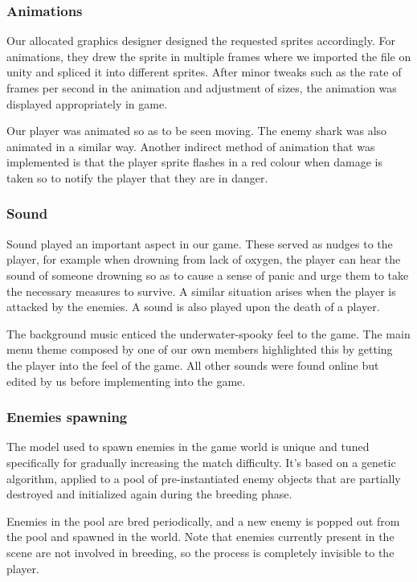 \documentclass[11pt]{article}
\begin{document}
\subsubsection{Animations}
Our allocated graphics designer designed the requested sprites accordingly. For animations, they drew the sprite in multiple frames where we imported the file on unity and spliced it into different sprites. After minor tweaks such as the rate of frames per second in the animation and adjustment of sizes, the animation was displayed appropriately in game.

Our player was animated so as to be seen moving. The enemy shark was also animated in a similar way. Another indirect method of animation that was implemented is that the player sprite flashes in a red colour when damage is taken so to notify the player that they are in danger.

\subsubsection{Sound}
Sound played an important aspect in our game. These served as nudges to the player, for example when drowning from lack of oxygen, the player can hear the sound of someone drowning so as to cause a sense of panic and urge them to take the necessary measures to survive. A similar situation arises when the player is attacked by the enemies. A sound is also played upon the death of a player.

The background music enticed the underwater-spooky feel to the game. The main menu theme composed by one of our own members highlighted this by getting the player into the feel of the game. All other sounds were found online but edited by us before implementing into the game.


\subsubsection{Enemies spawning}
The model used to spawn enemies in the game world is unique and tuned specifically for gradually increasing the match difficulty. It’s based on a genetic algorithm, applied to a pool of pre-instantiated enemy objects that are partially destroyed and initialized again during the breeding phase.

Enemies in the pool are bred periodically, and a new enemy is popped out from the pool and spawned in the world. Note that enemies currently present in the scene are not involved in breeding, so the process is completely invisible to the player.
\end{document}
